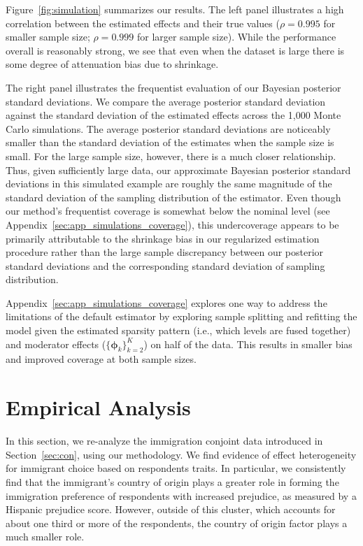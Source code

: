 \documentclass[11pt]{article}
\begin{document}
Figure~\ref{fig:simulation} summarizes our results. The left panel
illustrates a high correlation between the estimated effects and their true values ($\rho = 0.995$ for smaller sample size; $\rho = 0.999$ for larger sample size). While the performance overall is reasonably strong, we see that even when the dataset is large there is some degree of attenuation bias due to shrinkage.

The right panel illustrates the frequentist evaluation of our Bayesian
posterior standard deviations.  We compare the average posterior
standard deviation against the standard deviation of the estimated
effects across the 1,000 Monte Carlo simulations.  The average
posterior standard deviations are noticeably smaller than the standard
deviation of the estimates when the sample size is small.  For the
large sample size, however, there is a much closer relationship.
Thus, given sufficiently large data, our approximate Bayesian
posterior standard deviations in this simulated example are roughly
the same magnitude of the standard deviation of the sampling
distribution of the estimator. Even though our method's frequentist
coverage is somewhat below the nominal level (see
Appendix~\ref{sec:app_simulations_coverage}), this undercoverage
appears to be primarily attributable to the shrinkage bias in our
regularized estimation procedure rather than the large sample
discrepancy between our posterior standard deviations and the
corresponding standard deviation of sampling distribution.

Appendix~\ref{sec:app_simulations_coverage} explores one way to
address the limitations of the default estimator by exploring sample
splitting and refitting the model given the estimated sparsity pattern
(i.e., which levels are fused together) and moderator effects
($\{\bm{\phi}_k\}_{k=2}^K$) on half of the data. This results in
smaller bias and improved coverage at both sample sizes. 

\section{Empirical Analysis}\label{sec:analysis}

In this section, we re-analyze the immigration conjoint data
introduced in Section~\ref{sec:con}, using our methodology.  We find
evidence of effect heterogeneity for immigrant choice based on
respondents traits.  In particular, we consistently find that the
immigrant's country of origin plays a greater role in forming the
immigration preference of respondents with increased prejudice, as
measured by a Hispanic prejudice score.  However, outside of this
cluster, which accounts for about one third or more of the
respondents, the country of origin factor plays a much smaller role. 
\end{document}
